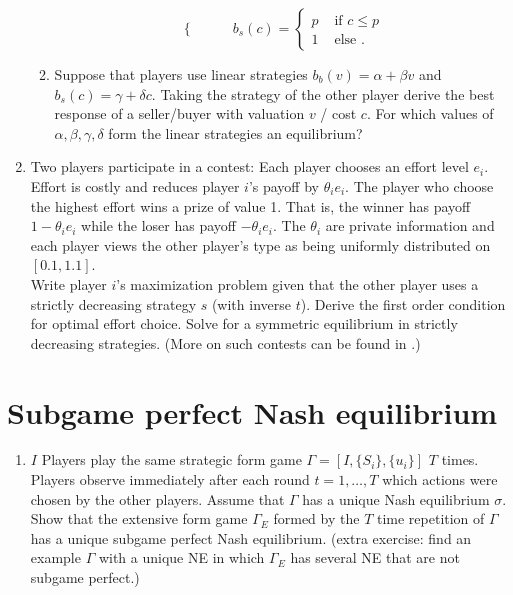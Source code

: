 \documentclass[a4paper,12pt]{article}
\begin{document}
\begin{enumerate}
\begin{enumerate}
\begin{equation*}
\begin{cases}
      \end{cases}
    \qquad
      b_s(c)=
      \begin{cases}
        p & \text{ if }c\leq p\\
        1 & \text{ else }.
      \end{cases}
    \end{equation*}
    \item Suppose that players use linear strategies $b_b(v)=\alpha+\beta v$ and $b_s(c)=\gamma+\delta c$. Taking the strategy of the other player derive the best response of a seller/buyer with valuation $v$ / cost $c$. For which values of $\alpha,\beta,\gamma,\delta$ form the linear strategies an equilibrium?
    \end{enumerate}
  \item Two players participate in a contest: Each player chooses an effort level $e_i$. Effort is costly and reduces player $i$'s payoff by  $\theta _ie_i$. The player who choose the highest effort wins a prize of value 1. That is, the winner has payoff $1-\theta _i e_i$ while the loser has payoff $-\theta _i e_i$. The $\theta _i$ are private information and each player views the other player's type as being uniformly distributed on $[0.1,1.1]$. \\
    Write player $i$'s maximization problem given that the other player uses a strictly decreasing strategy $s$ (with inverse $t$). Derive the first order condition for optimal effort choice. Solve for a symmetric equilibrium in strictly decreasing strategies.
    (More on such contests can be found in \cite{moldovanu2001optimal}.)
\end{enumerate}

\section{Subgame perfect Nash equilibrium}
\label{sec:subgame-perfect-nash}

\begin{enumerate}
\item $I$ Players play the same strategic form game $\Gamma=[I,\{S_i\},\{u_i\}]$ $T$ times. Players observe immediately after each round $t=1,\dots, T$ which actions were chosen by the other players. Assume that $\Gamma$ has a unique Nash equilibrium $\sigma$. Show that the extensive form game $\Gamma_E$ formed by the $T$ time repetition of $\Gamma$ has a unique subgame perfect Nash equilibrium. (extra exercise: find an example $\Gamma$ with a unique NE in which $\Gamma_E$ has several NE that are not subgame perfect.)
\end{enumerate}
\end{document}

